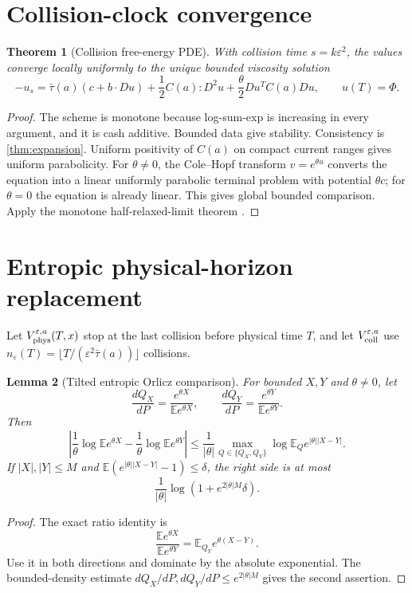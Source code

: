 \documentclass[11pt,reqno]{amsart}
\newtheorem{theorem}{Theorem}[section]
\newtheorem{lemma}[theorem]{Lemma}
\theoremstyle{remark}
\newcommand{\E}{\mathbb E}
\newcommand{\abs}[1]{\left\lvert #1\right\rvert}
\begin{document}
\section{Collision-clock convergence}
\begin{theorem}[Collision free-energy PDE]\label{thm:collision-pde}
With collision time $s=k\varepsilon^2$, the values converge locally uniformly
to the unique bounded viscosity solution
\[
 -u_s=\bar\tau(a)(c+b\cdot Du)
 +\frac12C(a):D^2u
 +\frac\theta2Du^TC(a)Du,
 \qquad u(T)=\Phi.
\]
\end{theorem}
\begin{proof}
The scheme is monotone because log-sum-exp is increasing in every argument,
and it is cash additive.  Bounded data give stability.  Consistency is
\cref{thm:expansion}.  Uniform positivity of $C(a)$ on compact current ranges gives uniform
parabolicity.  For $\theta\ne0$, the Cole--Hopf transform
$v=e^{\theta u}$ converts the equation into a linear uniformly parabolic
terminal problem with potential $\theta c$; for $\theta=0$ the equation is
already linear.  This gives global bounded comparison.  Apply the monotone
half-relaxed-limit theorem \cite{BarlesSouganidis1991,CrandallIshiiLions1992}.
\end{proof}

\section{Entropic physical-horizon replacement}
Let $V_{\rm phys}^{\varepsilon,a}(T,x)$ stop at the last collision before
physical time $T$, and let $V_{\rm coll}^{\varepsilon,a}$ use
$n_\varepsilon(T)=\lfloor T/(\varepsilon^2\bar\tau(a))\rfloor$ collisions.

\begin{lemma}[Tilted entropic Orlicz comparison]\label{lem:orlicz}
For bounded $X,Y$ and $\theta\ne0$, let
\[
 \frac{dQ_X}{dP}=\frac{e^{\theta X}}{\E e^{\theta X}},
 \qquad
 \frac{dQ_Y}{dP}=\frac{e^{\theta Y}}{\E e^{\theta Y}}.
\]
Then
\[
 \abs{
 \frac1\theta\log\E e^{\theta X}
 -\frac1\theta\log\E e^{\theta Y}}
 \le\frac1{\abs\theta}
 \max_{Q\in\{Q_X,Q_Y\}}
 \log\E_Qe^{\abs\theta\abs{X-Y}}.
\]
If $\abs X,\abs Y\le M$ and
$\E(e^{\abs\theta\abs{X-Y}}-1)\le\delta$, the right side is at most
\[
 \frac1{\abs\theta}\log(1+e^{2\abs\theta M}\delta).
\]
\end{lemma}
\begin{proof}
The exact ratio identity is
\[
 \frac{\E e^{\theta X}}{\E e^{\theta Y}}
 =\E_{Q_Y}e^{\theta(X-Y)}.
\]
Use it in both directions and dominate by the absolute exponential.  The
bounded-density estimate
$dQ_X/dP,dQ_Y/dP\le e^{2\abs\theta M}$ gives the second assertion.
\end{proof}
\end{document}
